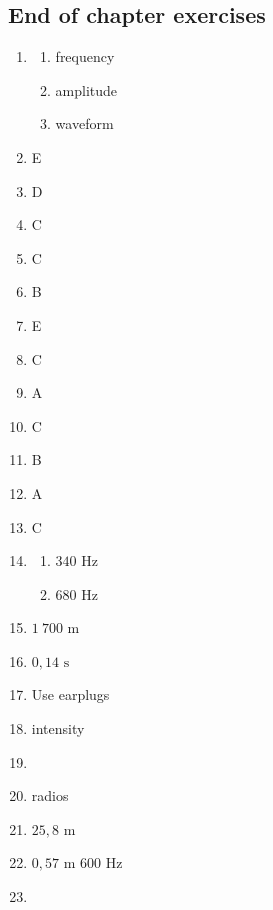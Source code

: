 \subsection{End of chapter exercises} 
\begin{multicols}{5}
  \begin{enumerate}[itemsep=5pt, label=\textbf{\arabic*}. ]
  \item %
    \begin{enumerate}[noitemsep, label=\textbf{(\alph*)} ]
    \item frequency
    \item amplitude
\item waveform
    \end{enumerate}
  \item %
E
  \item %
D
  \item %
C
  \item %
C
  \item %
B
  \item %
E
  \item %
C
  \item %
A
  \item %
C
    \item %
B
    \item %
A
\item %
C
\item %
    \begin{enumerate}[noitemsep, label=\textbf{(\alph*)} ]
    \item $340 \text{ Hz}$
    \item $680 \text{ Hz}$
    \end{enumerate}
\item %
$1~700 \text{ m}$
\item %
$0,14 \text{ s}$
\item %
Use earplugs
\item %
intensity
\item %
\item %
radios
\item %
$25,8 \text{ m}$
\item %
$0,57 \text{ m}$ $600 \text{ Hz}$
\item %

\end{enumerate}
\end{multicols}
